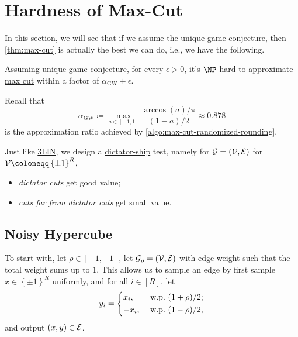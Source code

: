 \section{Hardness of Max-Cut}
In this section, we will see that if we assume the \hyperref[conj:unique-game]{unique game conjecture}, then \autoref{thm:max-cut} is actually the best we can do, i.e., we have the following.

\begin{theorem}[\cite{1366234}]\label{thm:max-cut}
	Assuming \hyperref[conj:unique-game]{unique game conjecture}, for every \(\epsilon > 0 \), it's \(\NP\)-hard to approximate \hyperref[prb:max-cut]{max cut}  within a factor of \(\alpha _{\mathrm{GW} }+\epsilon \).
\end{theorem}

\begin{prev}
	Recall that
	\[
		\alpha _{\mathrm{GW} } \coloneqq \max _{a\in [-1, 1]}\frac{\arccos (a) / \pi }{(1 - a) / 2} \approx 0.878
	\]
	is the approximation ratio achieved by \autoref{algo:max-cut-randomized-rounding}.
\end{prev}

Just like \hyperref[prb:max-3LIN]{3LIN}, we design a \hyperref[not:dictation]{dictator-ship} test, namely for \(\mathcal{\MakeUppercase{g}} =(\mathcal{\MakeUppercase{v}} , \mathcal{\MakeUppercase{e}} )\) for \(\mathcal{\MakeUppercase{v}} \coloneqq \left\{ \pm 1 \right\} ^R\),
\begin{itemize}
	\item \emph{dictator cuts} get good value;
	\item \emph{cuts far from dictator cuts} get small value.
\end{itemize}

\subsection{Noisy Hypercube}
To start with, let \(\rho \in [-1, +1]\), let \(\mathcal{\MakeUppercase{g}} _{\rho} = (\mathcal{\MakeUppercase{v}} , \mathcal{\MakeUppercase{e}} )\) with edge-weight such that the total weight sums up to \(1\). This allows us to sample an edge by first sample \(x\in \left\{ \pm 1 \right\} ^R\) uniformly, and for all \(i\in [R]\), let
\[
	y_i = \begin{dcases}
		x_i,  & \text{ w.p.\  } (1 + \rho ) / 2 ; \\
		-x_i, & \text{ w.p.\  } (1 - \rho ) / 2,
	\end{dcases}
\]
and output \((x, y)\in \mathcal{\MakeUppercase{e}} \).

